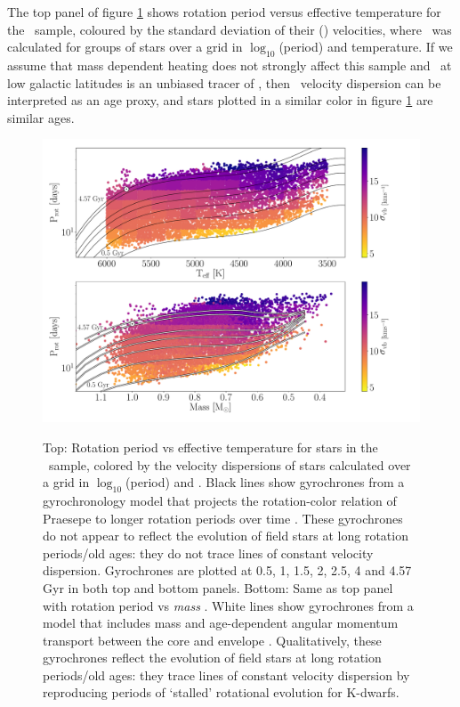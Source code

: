 The top panel of figure \ref{fig:vplot} shows rotation period versus effective
temperature for the \mct\ sample, coloured by the standard deviation of their
(\vb) velocities, where \sigmavb\ was calculated for groups of stars over a
grid in $\log_{10}$(period) and temperature.
If we assume that mass dependent heating does not strongly affect this sample
and \vb\ at low galactic latitudes is an unbiased tracer of \vz, then \vb\
velocity dispersion can be interpreted as an age proxy, and stars plotted in a
similar color in figure \ref{fig:vplot} are similar ages.
\begin{figure}
  \caption{
    Top: Rotation period vs effective temperature for stars in the \mct\
    sample, colored by the velocity dispersions of stars calculated over a
    grid in $\log_{10}$(period) and \teff.
    Black lines show gyrochrones from a gyrochronology model that projects the
    rotation-color relation of
    Praesepe to longer rotation periods over time \citep{angus2019}.
    These gyrochrones do not appear to reflect the evolution of field stars at
    long rotation periods/old ages: they do not trace lines of constant
    velocity dispersion.
    Gyrochrones are plotted at 0.5, 1, 1.5, 2, 2.5, 4 and 4.57 Gyr in both top
    and bottom panels.
    Bottom: Same as top panel with rotation period vs {\it mass}
    \citep[from][]{berger2020}.
    White lines show gyrochrones from a model that includes mass and
    age-dependent angular momentum transport between the core and envelope
    \citep{spada2019}.
    Qualitatively, these gyrochrones reflect the evolution of field
    stars at long rotation periods/old ages: they trace lines of constant
    velocity dispersion by reproducing periods of `stalled' rotational
    evolution for K-dwarfs.
}
  \centering
    \includegraphics[width=1\textwidth]{main_figure}
\label{fig:vplot}
\end{figure}
